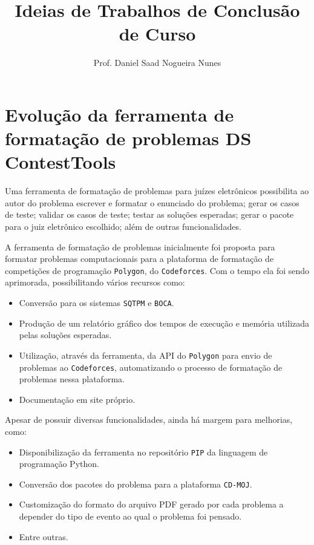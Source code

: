 \documentclass{article}
\author{Prof. Daniel Saad Nogueira Nunes}
\title{Ideias de Trabalhos de Conclusão de Curso}
\date{}
\newcommand*{\nsection}[1]{
    \section{#1}
}
\newcommand{\polygon}{\texttt{Polygon}\xspace}
\newcommand{\codeforces}{\texttt{Codeforces}\xspace}
\newcommand{\sqtpm}{\texttt{SQTPM}\xspace}
\newcommand{\boca}{\texttt{BOCA}\xspace}
\newcommand{\pip}{\texttt{PIP}\xspace}
\newcommand{\cdmoj}{\texttt{CD-MOJ}\xspace}
\begin{document}
\maketitle
\setcounter{tocdepth}{1}
\setcounter{secnumdepth}{1}
\tableofcontents
{}	





\nsection{Evolução da ferramenta de formatação de problemas DS ContestTools}

Uma ferramenta de formatação de problemas para juízes eletrônicos possibilita ao autor do problema escrever e formatar o enunciado do problema; gerar os casos de teste; validar os casos de teste; testar as soluções esperadas;  gerar o pacote para o juiz eletrônico escolhido; além de outras funcionalidades.

A ferramenta de formatação de problemas  inicialmente foi proposta para formatar problemas computacionais para a plataforma de formatação de competições de programação \polygon, do \codeforces. Com o tempo ela foi sendo aprimorada, possibilitando vários recursos como:

\begin{itemize}
	\item Conversão para os sistemas \sqtpm e \boca.
	\item Produção de um relatório gráfico dos tempos de execução e memória utilizada pelas soluções esperadas.
	\item Utilização, através da ferramenta, da API do \polygon para envio de problemas ao \codeforces, automatizando o processo de formatação de problemas nessa plataforma.
	\item Documentação em site próprio.
\end{itemize}

Apesar de possuir diversas funcionalidades, ainda há margem para melhorias, como:

\begin{itemize}
	\item Disponibilização da ferramenta no repositório \pip da linguagem de programação Python.
	\item Conversão dos pacotes do problema para a plataforma \cdmoj.
	\item Customização do formato do arquivo PDF gerado por cada problema a depender do tipo de evento ao qual o problema foi pensado.
	\item Entre outras.
\end{itemize}
\end{document}

